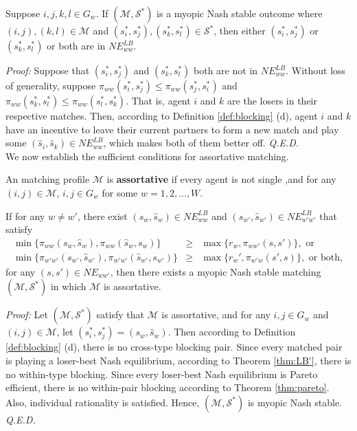 \documentclass{myPaper}
\begin{document}
\begin{theorem} \label{thm:LB'}
Suppose $i, j, k, l \in G_w$. If $(\mathcal{M}, \mathcal{S}^*)$ is a myopic Nash stable outcome where $(i, j), (k, l) \in \mathcal{M}$ and $(s_i^*, s_j^*), (s_k^*, s_l^*) \in \mathcal{S}^*$, then either $(s_i^*, s_j^*)$ or $(s_k^*, s_l^*)$ or both are in $ NE_{ww}^{LB}$.
\end{theorem}
\noindent \textit{Proof:} Suppose that $(s_i^*, s_j^*)$ and $ (s_k^*, s_l^*)$ both are not in $ NE_{ww}^{LB}$. Without loss of generality, suppose $\pi_{ww}(s_i^*, s_j^*) \le \pi_{ww}(s_j^*, s_i^*)$ and $\pi_{ww}(s_k^*, s_l^*) \le \pi_{ww}(s_l^*, s_k^*)$. That is, agent $i$ and $k$ are the losers in their respective matches. Then, according to Definition \ref{def:blocking} (d), agent $i$ and $k$ have an incentive to leave their current partners to form a new match and play some $(\hat{s}_i, \hat{s}_k) \in NE_{ww}^{ LB}$, which makes both of them better off. \textit{Q.E.D.}
\\

We now establish the sufficient conditions for assortative matching. 

\begin{definition} \label{def:assort}
An matching profile $\mathcal{M}$ is \textbf{assortative} if every agent is not single ,and for any $(i, j) \in \mathcal{M}$, $i, j \in G_w$ for some $w=1, 2, ..., W$.
\end{definition}

\begin{theorem} \label{thm:assort}
If for any $w \ne w'$, there exist $(s_w, \hat{s}_{w}) \in NE_{ww}^{LB}$ and $(s_{w'}, \hat{s}_{w'}) \in NE_{w'w'}^{LB}$ that satisfy  
\begin{eqnarray}
    \min\{\pi_{ww}(s_w, \hat{s}_{w}), \pi_{ww}(\hat{s}_{w}, s_w)\} &\ge& \max\{r_w, \pi_{ww'}(s, s')\}, \text{ or } \nonumber \\
      \min\{\pi_{w'w'}(s_{w'}, \hat{s}_{w'}), \pi_{w'w'}(\hat{s}_{w'}, s_{w'})\} &\ge& \max\{r_w', \pi_{w'w}(s', s)\}, \text{ or both},\nonumber
\end{eqnarray}
for any $(s, s') \in NE_{ww'}$, then there exists a myopic Nash stable matching $(\mathcal{M}, \mathcal{S}^*)$ in which $\mathcal{M}$ is assortative. 
\end{theorem}
\noindent \textit{Proof:}
Let $(\mathcal{M}, \mathcal{S}^*)$ satisfy that $\mathcal{M}$ is assortative, and for any $i, j \in G_w$ and $(i, j) \in \mathcal{M}$, let $(s_i^*, s_j^*)=(s_w, \hat{s}_{w})$. Then according to Definition \ref{def:blocking} (d), there is no cross-type blocking pair. Since every matched pair is playing a loser-best Nash equilibrium, according to Theorem \ref{thm:LB'}, there is no within-type blocking. Since every loser-best Nash equilibrium is Pareto efficient, there is no within-pair blocking according to Theorem \ref{thm:pareto}. Also, individual rationality is satisfied. Hence, $(\mathcal{M}, \mathcal{S}^*)$ is myopic Nash stable. 
\textit{Q.E.D.}
\end{document}
